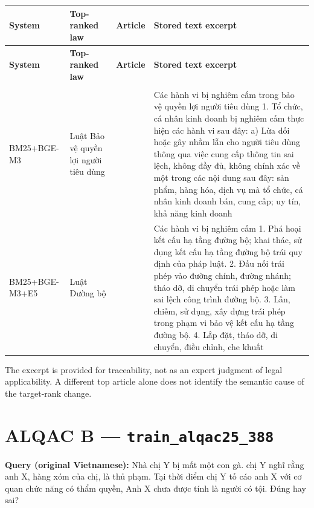 \begingroup
\scriptsize
\setlength{\tabcolsep}{2pt}
\renewcommand{\arraystretch}{1.0}
\begin{longtable}{>{\raggedright\arraybackslash}p{1.866cm}>{\raggedright\arraybackslash}p{3.033cm}>{\raggedright\arraybackslash}p{1.745cm}>{\raggedright\arraybackslash}p{8.476cm}}
\toprule
\textbf{System} & \textbf{Top-ranked law} & \textbf{Article} & \textbf{Stored text excerpt} \\
\midrule
\endfirsthead
\toprule
\textbf{System} & \textbf{Top-ranked law} & \textbf{Article} & \textbf{Stored text excerpt} \\
\midrule
\endhead
\midrule
\multicolumn{4}{r}{\footnotesize Continued on next page}\\
\endfoot
\bottomrule
\endlastfoot
BM25+\allowbreak{}BGE-M3 & Luật Bảo vệ quyền lợi người tiêu dùng & 10 & Các hành vi bị nghiêm cấm trong bảo vệ quyền lợi người tiêu dùng 1. Tổ chức, cá nhân kinh doanh bị nghiêm cấm thực hiện các hành vi sau đây: a) Lừa dối hoặc gây nhầm lẫn cho người tiêu dùng thông qua việc cung cấp thông tin sai lệch, không đầy đủ, không chính xác về một trong các nội dung sau đây: sản phẩm, hàng hóa, dịch vụ mà tổ chức, cá nhân kinh doanh bán, cung cấp; uy tín, khả năng kinh doanh \\
BM25+\allowbreak{}BGE-M3+\allowbreak{}E5 & Luật Đường bộ & 7 & Các hành vi bị nghiêm cấm 1. Phá hoại kết cấu hạ tầng đường bộ; khai thác, sử dụng kết cấu hạ tầng đường bộ trái quy định của pháp luật. 2. Đấu nối trái phép vào đường chính, đường nhánh; tháo dỡ, di chuyển trái phép hoặc làm sai lệch công trình đường bộ. 3. Lấn, chiếm, sử dụng, xây dựng trái phép trong phạm vi bảo vệ kết cấu hạ tầng đường bộ. 4. Lắp đặt, tháo dỡ, di chuyển, điều chỉnh, che khuất \\
\end{longtable}
\endgroup

The excerpt is provided for traceability, not as an expert judgment of legal applicability. A different top article alone does not identify the semantic cause of the target-rank change.

\section{ALQAC B — \texttt{train\_al\allowbreak{}qac25\_38\allowbreak{}8}}

\textbf{Query (original Vietnamese):} Nhà chị Y bị mất một con gà. chị Y nghĩ rằng anh X, hàng xóm của chị, là thủ phạm. Tại thời điểm chị Y tố cáo anh X với cơ quan chức năng có thẩm quyền, Anh X chưa được tính là người có tội. Đúng hay sai?

